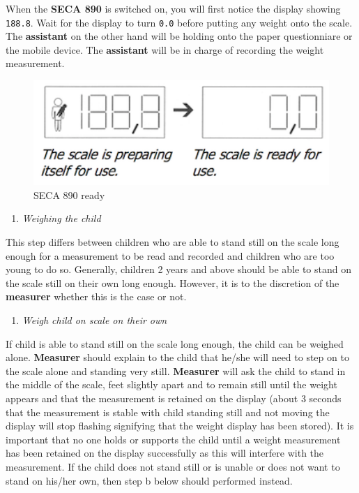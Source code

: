 \documentclass[12pt,]{book}
\providecommand{\tightlist}{%
  \setlength{\itemsep}{0pt}\setlength{\parskip}{0pt}}
\theoremstyle{definition}
\theoremstyle{definition}
\theoremstyle{definition}
\theoremstyle{remark}
\begin{document}
When the \textbf{SECA 890} is switched on, you will first notice the
display showing \texttt{188.8}. Wait for the display to turn
\texttt{0.0} before putting any weight onto the scale. The
\textbf{assistant} on the other hand will be holding onto the paper
questionniare or the mobile device. The \textbf{assistant} will be in
charge of recording the weight measurement.

\begin{figure}

{\centering \includegraphics[width=4.86in]{images/seca890zero} 

}

\caption{SECA 890 ready}\label{fig:weight8}
\end{figure}

\begin{enumerate}
\def\labelenumi{\arabic{enumi}.}
\setcounter{enumi}{2}
\tightlist
\item
  \emph{Weighing the child}
\end{enumerate}

This step differs between children who are able to stand still on the
scale long enough for a measurement to be read and recorded and children
who are too young to do so. Generally, children 2 years and above should
be able to stand on the scale still on their own long enough. However,
it is to the discretion of the \textbf{measurer} whether this is the
case or not.

\begin{enumerate}
\def\labelenumi{\alph{enumi}.}
\tightlist
\item
  \emph{Weigh child on scale on their own}
\end{enumerate}

If child is able to stand still on the scale long enough, the child can
be weighed alone. \textbf{Measurer} should explain to the child that
he/she will need to step on to the scale alone and standing very still.
\textbf{Measurer} will ask the child to stand in the middle of the
scale, feet slightly apart and to remain still until the weight appears
and that the measurement is retained on the display (about 3 seconds
that the measurement is stable with child standing still and not moving
the display will stop flashing signifying that the weight display has
been stored). It is important that no one holds or supports the child
until a weight measurement has been retained on the display successfully
as this will interfere with the measurement. If the child does not stand
still or is unable or does not want to stand on his/her own, then step b
below should performed instead.
\end{document}

